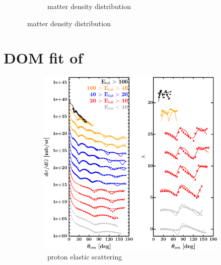 \begin{figure}[hbtp]
\begin{subfigure}{0.70\textwidth}
        \caption{\caForty\ matter density distribution}
        \label{DOMFitData_ca40_matterDensity}
    \end{subfigure}
\end{figure}

\newpage
\section{DOM fit of \caEight}
\label{ca48DOMOutput}
\begin{figure}[hbtp]
    \captionsetup[subfigure]{labelformat=empty}
    \centering
    \begin{subfigure}[c]{0.39\textheight}
        \centering
        \includegraphics[width=\linewidth]{figures/ca48_protonElastic.png}
        \caption{\caEight\ proton elastic scattering}
        \label{DOMFitData_ca48_proton_elastic}
    \end{subfigure}\hspace{6pt}
    \begin{subfigure}[c]{0.39\textheight}
        \centering

\end{subfigure}
\end{figure}
